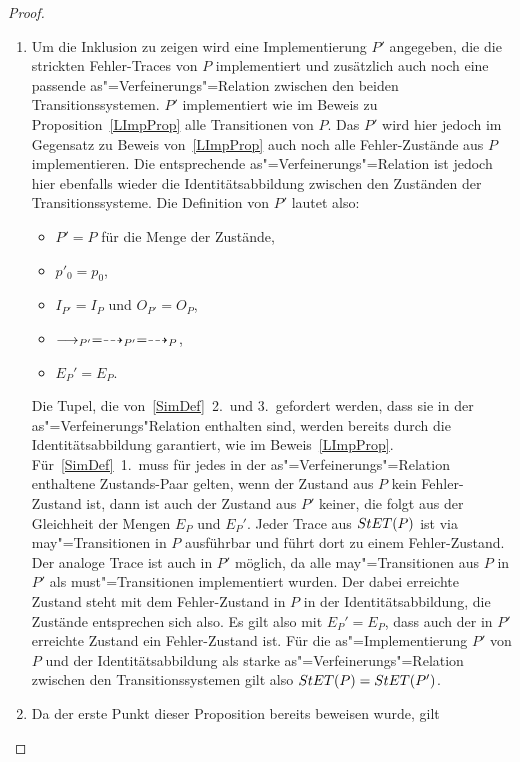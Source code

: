 \begin{proof}\mbox{}
  \begin{enumerate}
    \item Um die Inklusion zu zeigen wird eine Implementierung $P'$ angegeben,
      die die strickten Fehler-Traces von $P$ implementiert und zusätzlich auch
      noch eine passende as"=Verfeinerungs"=Relation zwischen den beiden
      Transitionssystemen. $P'$ implementiert wie im Beweis zu
      Proposition~\ref{LImpProp} alle Transitionen von $P$. Das $P'$ wird hier
      jedoch im Gegensatz zu Beweis von~\ref{LImpProp} auch noch alle
      Fehler-Zustände aus $P$ implementieren. Die entsprechende
      as"=Verfeinerungs"=Relation ist jedoch hier ebenfalls wieder die
      Identitätsabbildung zwischen den Zuständen der Transitionssysteme. Die
      Definition von $P'$ lautet also:
      \begin{itemize}
        \item $P'=P$ für die Menge der Zustände,
        \item $p'_0=p_0$,
        \item $I_{P'}=I_P$ und $O_{P'}=O_P$,
        \item $\must _{P'} =\may _{P'} = \may _P$,
        \item $E_P'=E_P$.
      \end{itemize}
      Die Tupel, die von~\ref{SimDef}~2.\ und 3.\ gefordert werden, dass sie in
      der as"=Verfeinerungs"Relation enthalten sind, werden bereits durch die
      Identitätsabbildung garantiert, wie im Beweis~\ref{LImpProp}.
      Für~\ref{SimDef}~1.\ muss für jedes in der as"=Verfeinerungs"=Relation
      enthaltene Zustands-Paar gelten, wenn der Zustand aus $P$ kein
      Fehler-Zustand ist, dann ist auch der Zustand aus $P'$ keiner, die folgt
      aus der Gleichheit der Mengen $E_P$ und $E_P'$. Jeder Trace aus $StET
      (P)$ ist via may"=Transitionen in $P$ ausführbar und führt dort zu einem
      Fehler-Zustand. Der analoge Trace ist auch in $P'$ möglich, da alle
      may"=Transitionen aus $P$ in $P'$ als must"=Transitionen implementiert
      wurden. Der dabei erreichte Zustand steht mit dem Fehler-Zustand in $P$
      in der Identitätsabbildung, die Zustände entsprechen sich also. Es gilt
      also mit $E_P'=E_P$, dass auch der in $P'$ erreichte Zustand ein
      Fehler-Zustand ist. Für die as"=Implementierung $P'$ von $P$ und der
      Identitätsabbildung als starke as"=Verfeinerungs"=Relation zwischen den
      Transitionssystemen gilt also $StET (P) =StET (P')$.
    \item Da der erste Punkt dieser Proposition bereits beweisen wurde, gilt

\end{enumerate}
\end{proof}
